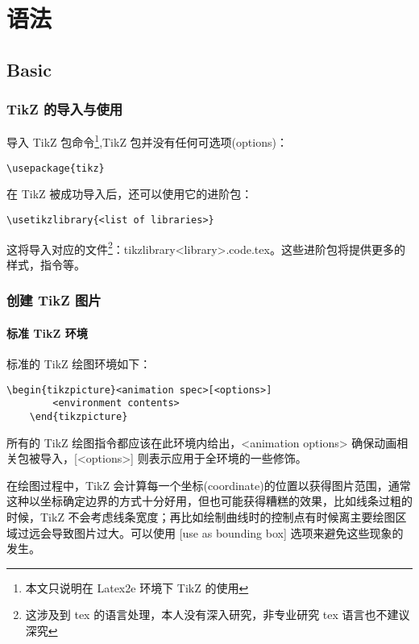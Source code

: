 \chapter{语法}
\section{Basic}
\subsection{TikZ 的导入与使用}

导入 TikZ 包命令\footnote{本文只说明在 Latex2e 环境下 TikZ 的使用},TikZ 包并没有任何可选项(options)：
\begin{lstlisting}[style = latex]
    \usepackage{tikz}
\end{lstlisting}

在 TikZ 被成功导入后，还可以使用它的进阶包：
\begin{lstlisting}[style = latex]
    \usetikzlibrary{<list of libraries>}
\end{lstlisting}
这将导入对应的文件\footnote{这涉及到 tex 的语言处理，本人没有深入研究，非专业研究 tex 语言也不建议深究}：tikzlibrary<library>.code.tex。这些进阶包将提供更多的样式，指令等。

\subsection{创建 TikZ 图片}
\subsubsection{标准 TikZ 环境}

标准的 TikZ 绘图环境如下：
\begin{lstlisting}[style = latex]
    \begin{tikzpicture}<animation spec>[<options>]
        <environment contents>
    \end{tikzpicture}
\end{lstlisting}
所有的 TikZ 绘图指令都应该在此环境内给出，<animation options> 确保动画相关包被导入，[<options>] 则表示应用于全环境的一些修饰。

在绘图过程中，TikZ 会计算每一个坐标(coordinate)的位置以获得图片范围，通常这种以坐标确定边界的方式十分好用，但也可能获得糟糕的效果，比如线条过粗的时候，TikZ 不会考虑线条宽度；再比如绘制曲线时的控制点有时候离主要绘图区域过远会导致图片过大。可以使用 [use as bounding box] 选项来避免这些现象的发生。

